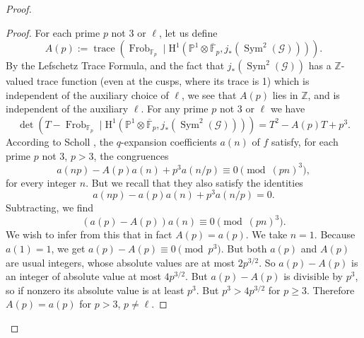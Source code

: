 \begin{proof}
\begin{proof}
For each prime \(p\) not 3 or \(\ell\), let us define
\[
A(p):=\operatorname{trace}(\operatorname{Frob}_{\mathbb{F}_p}\mid\mathrm{H}^1(\mathbb{P}^1\otimes\overline{\mathbb{F}}_p,j_*(\operatorname{Sym}^2(\mathcal{G})))).
\]
By the Lefschetz Trace Formula, and the fact that \(j_*(\operatorname{Sym}^2(\mathcal{G}))\) has a \(\mathbb{Z}\)-valued trace function (even at the cusps, where its trace is 1) which is independent of the auxiliary choice of \(\ell\), we see that \(A(p)\) lies in \(\mathbb{Z}\), and is independent of the auxiliary \(\ell\). For any prime \(p\) not 3 or \(\ell\) we have
\[
\det(T-\operatorname{Frob}_{\mathbb{F}_p}\mid\mathrm{H}^1(\mathbb{P}^1\otimes\overline{\mathbb{F}}_p,j_*(\operatorname{Sym}^2(\mathcal{G}))))=T^2-A(p)T+p^3.
\]
According to Scholl \cite[Theorem 5.4, applied to \(k=2\) and \(\Gamma:=\Gamma(3)\): the ``\(M\)'' of Prop. 5.2 is then 3]{Sch}, the \(q\)-expansion coefficients \(a(n)\) of \(f\) satisfy, for each prime \(p\) not \(3\), \(p>3\), the congruences
\[
a(np)-A(p)a(n)+p^3a(n/p)\equiv0\pmod{(pn)^3},
\]
for every integer \(n\). But we recall that they also satisfy the identities
\[
a(np)-a(p)a(n)+p^3a(n/p)=0.
\]
Subtracting, we find
\[
(a(p)-A(p))a(n)\equiv0\pmod{(pn)^3}.
\]
We wish to infer from this that in fact \(A(p)=a(p)\). We take \(n=1\). Because \(a(1)=1\), we get \(a(p)-A(p)\equiv0\pmod{p^3}\). But both \(a(p)\) and \(A(p)\) are usual integers, whose absolute values are at most \(2p^{3/2}\). So \(a(p)-A(p)\) is an integer of absolute value at most \(4p^{3/2}\). But \(a(p)-A(p)\) is divisible by \(p^3\), so if nonzero its absolute value is at least \(p^3\). But \(p^3>4p^{3/2}\) for \(p\geq3\). Therefore \(A(p)=a(p)\) for \(p>3\), \(p\ne\ell\).


\end{proof}
\end{proof}
